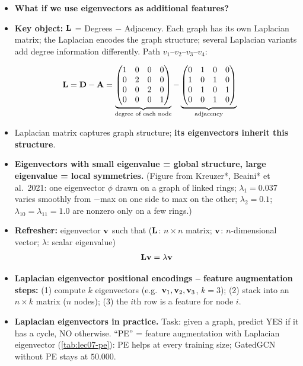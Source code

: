 \begin{itemize}
  \item \textbf{What if we use eigenvectors as additional features?}
  \item \textbf{Key object:}  $\mathbf{L}$ = Degrees $-$
    Adjacency. Each graph has its own Laplacian matrix; the Laplacian encodes the
    graph structure; several Laplacian variants add degree information
    differently. Path $v_1$--$v_2$--$v_3$--$v_4$:
\end{itemize}
\begin{equation}\label{eq:lec07-lap}
  \mathbf{L} = \mathbf{D} - \mathbf{A}
  = \underbrace{\begin{pmatrix}1&0&0&0\\0&2&0&0\\0&0&2&0\\0&0&0&1\end{pmatrix}}_{\text{degree of each node}}
  - \underbrace{\begin{pmatrix}0&1&0&0\\1&0&1&0\\0&1&0&1\\0&0&1&0\end{pmatrix}}_{\text{adjacency}}
\end{equation}
\begin{itemize}
  \item Laplacian matrix captures graph structure; \textbf{its eigenvectors
    inherit this structure}.
  \item \textbf{Eigenvectors with small eigenvalue = global structure, large
    eigenvalue = local symmetries.} (Figure from Kreuzer*, Beaini* et al.\ 2021:
    one eigenvector $\phi$ drawn on a graph of linked rings; $\lambda_1=0.037$
    varies smoothly from $-$max on one side to max on the other; $\lambda_2=0.1$;
    $\lambda_{10}=\lambda_{11}=1.0$ are nonzero only on a few rings.)
  \item \textbf{Refresher:} eigenvector $\mathbf{v}$ such that ($\mathbf{L}$: $n\times n$
    matrix; $\mathbf{v}$: $n$-dimensional vector; $\lambda$: scalar eigenvalue)
    \begin{equation}\label{eq:lec07-eigvec}
      \mathbf{L}\mathbf{v}=\lambda\mathbf{v}
    \end{equation}
  \item \textbf{Laplacian eigenvector positional encodings -- feature augmentation
    steps:} (1) compute $k$ eigenvectors (e.g.\ $\mathbf{v}_1,\mathbf{v}_2,\mathbf{v}_3$, $k=3$); (2)
    stack into an $n\times k$ matrix ($n$ nodes); (3) the $i$th row is a feature
    for node $i$.
  \item \textbf{Laplacian eigenvectors in practice.} Task: given a graph, predict
    YES if it has a cycle, NO otherwise. ``PE'' = feature augmentation with
    Laplacian eigenvector (\cref{tab:lec07-pe}): PE helps at every training size;
    GatedGCN without PE stays at $50.000$.
\end{itemize}

